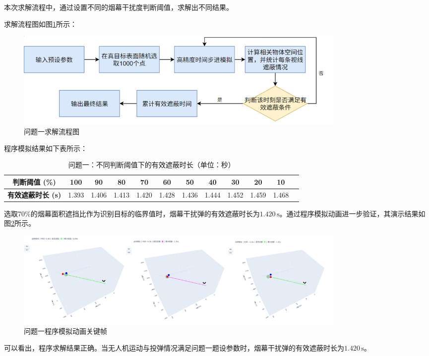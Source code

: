 \documentclass[12pt]{article}
\begin{document}
\begin{CJK}{UTF8}{gbsn}
		本次求解流程中，通过设置不同的烟幕干扰度判断阈值，求解出不同结果。
		
		求解流程图如图\ref{fig:flowchart_q1}所示：
		
		\begin{figure}[H]
			\centering
			\includegraphics[width=0.8\textwidth]{pic/Fg2.png}
			\caption{问题一求解流程图}
			\label{fig:flowchart_q1}
		\end{figure}
		
		程序模拟结果如下表所示：
		
		\begin{table}[H]
			\centering
			\caption{问题一：不同判断阈值下的有效遮蔽时长（单位：秒）}
			\label{tab:results_q1}
			\begin{tabular}{cccccccccccc}
				\toprule
				\textbf{判断阈值 (\%)} & \textbf{100} & \textbf{90} & \textbf{80} & \textbf{70} & \textbf{60} & \textbf{50} & \textbf{40} & \textbf{30} & \textbf{20} & \textbf{10} \\
				\midrule
				\textbf{有效遮蔽时长 (s)} & 1.393 & 1.406 & 1.413 & 1.420 & 1.428 & 1.436 & 1.444 & 1.452 & 1.459 & 1.468 \\
				\bottomrule
			\end{tabular}
		\end{table}
		
		选取70\%的烟幕面积遮挡比作为识别目标的临界值时，烟幕干扰弹的有效遮蔽时长为$1.420\,\mathrm{s}$。通过程序模拟动画进一步验证，其演示结果如图\ref{fig:simulation_q1}所示。
		
		\begin{figure}[H]
			\centering
			\includegraphics[width=0.8\textwidth]{pic/Fg3.png}
			\caption{问题一程序模拟动画关键帧}
			\label{fig:simulation_q1}
		\end{figure}
		
		可以看出，程序求解结果正确。当无人机运动与投弹情况满足问题一题设参数时，烟幕干扰弹的有效遮蔽时长为$1.420\,\mathrm{s}$。
		

\end{CJK}
\end{document}
